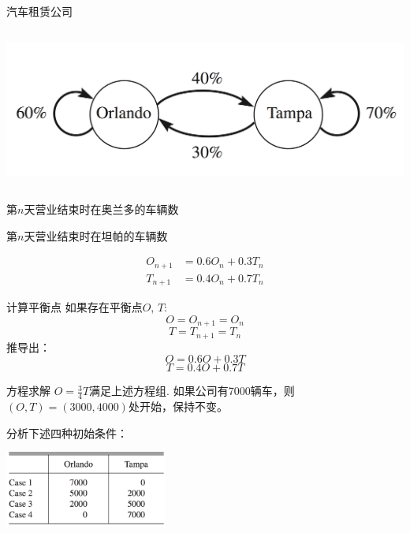 \documentclass[
  ignorenonframetext,
]{ctexbeamer}
\providecommand{\tightlist}{%
  \setlength{\itemsep}{0pt}\setlength{\parskip}{0pt}}\usepackage{longtable,booktabs,array}
\begin{document}
\begin{frame}{汽车租赁公司}
\label{ux6c7dux8f66ux79dfux8d41ux516cux53f8}
\begin{columns}[T]
\begin{column}{0.8\textwidth}
\includegraphics{taxi.png}
\end{column}
\end{columns}

\begin{description}
\tightlist
\item[\(O_n\)]
第\(n\)天营业结束时在奥兰多的车辆数
\item[\(T_n\)]
第\(n\)天营业结束时在坦帕的车辆数
\end{description}

\[
\begin{align*}
O_{n+1} &=0.6O_n + 0.3T_n \\
T_{n+1} &=0.4O_n + 0.7T_n
\end{align*}
\]
\end{frame}

\begin{frame}{计算平衡点}
\label{ux8ba1ux7b97ux5e73ux8861ux70b9}
如果存在平衡点\(O\), \(T\): \[O=O_{n+1}=O_n\] \[T=T_{n+1}=T_n\] 推导出：
\[O=0.6O + 0.3T\] \[T=0.4O + 0.7T\]
\end{frame}

\begin{frame}{方程求解}
\label{ux65b9ux7a0bux6c42ux89e3}
\(O=\frac{3}{4}T\)满足上述方程组.
如果公司有7000辆车，则\((O, T) = (3000, 4000)\)处开始，保持不变。

分析下述四种初始条件：

\includegraphics[width=0.4\textwidth,height=\textheight]{taxi-cases.png}
\end{frame}
\end{document}
